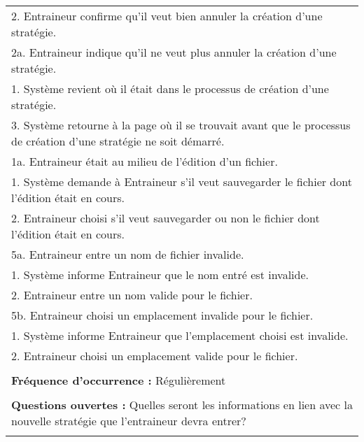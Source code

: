 \begin{longtable}{|p{16cm}|}
	\hspace{1cm}2. Entraineur confirme qu'il veut bien annuler la création d'une stratégie.\\
	\hspace{2cm}2a. Entraineur indique qu'il ne veut plus annuler la création d'une stratégie.\\
	\hspace{3cm}1. Système revient où il était dans le processus de création d'une stratégie.\\
	\hspace{1cm}3. Système retourne à la page où il se trouvait avant que le processus de création d'une stratégie ne soit démarré.\\
	1a. Entraineur était au milieu de l'édition d'un fichier.\\
	\hspace{1cm}1. Système demande à Entraineur s'il veut sauvegarder le fichier dont l'édition était en cours.\\
	\hspace{1cm}2. Entraineur choisi s'il veut sauvegarder ou non le fichier dont l'édition était en cours.\\
	5a. Entraineur entre un nom de fichier invalide.\\
	\hspace{1cm}1. Système informe Entraineur que le nom entré est invalide.\\
	\hspace{1cm}2. Entraineur entre un nom valide pour le fichier.\\
	5b. Entraineur choisi un emplacement invalide pour le fichier.\\
	\hspace{1cm}1. Système informe Entraineur que l'emplacement choisi est invalide.\\
	\hspace{1cm}2. Entraineur choisi un emplacement valide pour le fichier.\\
	\\
	\textbf{Fréquence d'occurrence :} Régulièrement\\
	\\
	\textbf{Questions ouvertes :} Quelles seront les informations en lien avec la nouvelle stratégie que l'entraineur devra entrer?\\
	\\
	\hline
\end{longtable}

